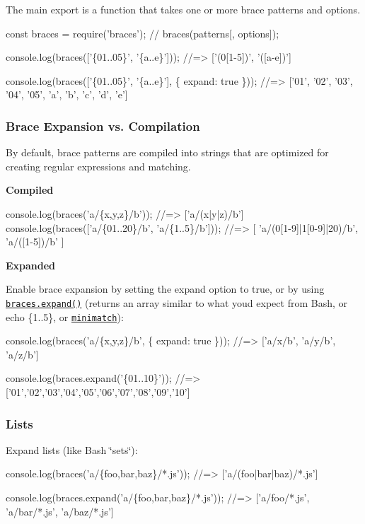 The main export is a function that takes one or more brace {\ttfamily patterns} and {\ttfamily options}.


\begin{DoxyCode}
const braces = require('braces');
// braces(patterns[, options]);

console.log(braces(['\{01..05\}', '\{a..e\}']));
//=> ['(0[1-5])', '([a-e])']

console.log(braces(['\{01..05\}', '\{a..e\}'], \{ expand: true \}));
//=> ['01', '02', '03', '04', '05', 'a', 'b', 'c', 'd', 'e']
\end{DoxyCode}


\subsubsection*{Brace Expansion vs. Compilation}

By default, brace patterns are compiled into strings that are optimized for creating regular expressions and matching.

{\bfseries Compiled}


\begin{DoxyCode}
console.log(braces('a/\{x,y,z\}/b')); 
//=> ['a/(x|y|z)/b']
console.log(braces(['a/\{01..20\}/b', 'a/\{1..5\}/b'])); 
//=> [ 'a/(0[1-9]|1[0-9]|20)/b', 'a/([1-5])/b' ]
\end{DoxyCode}


{\bfseries Expanded}

Enable brace expansion by setting the {\ttfamily expand} option to true, or by using \href{#expand}{\tt braces.\+expand()} (returns an array similar to what you\textquotesingle{}d expect from Bash, or {\ttfamily echo \{1..5\}}, or \href{https://github.com/isaacs/minimatch}{\tt minimatch})\+:


\begin{DoxyCode}
console.log(braces('a/\{x,y,z\}/b', \{ expand: true \}));
//=> ['a/x/b', 'a/y/b', 'a/z/b']

console.log(braces.expand('\{01..10\}'));
//=> ['01','02','03','04','05','06','07','08','09','10']
\end{DoxyCode}


\subsubsection*{Lists}

Expand lists (like Bash \char`\"{}sets\char`\"{})\+:


\begin{DoxyCode}
console.log(braces('a/\{foo,bar,baz\}/*.js'));
//=> ['a/(foo|bar|baz)/*.js']

console.log(braces.expand('a/\{foo,bar,baz\}/*.js'));
//=> ['a/foo/*.js', 'a/bar/*.js', 'a/baz/*.js']
\end{DoxyCode}


